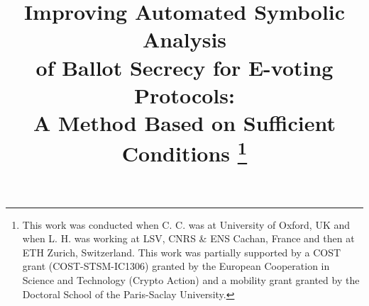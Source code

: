 \documentclass[a4paper,conference]{IEEEtran}
\begin{document}
\title{Improving Automated Symbolic Analysis \\
of Ballot Secrecy for E-voting Protocols:\\
A Method Based on Sufficient Conditions%
\thanks{This work was conducted when
C. C. was at University of Oxford, UK and
when L. H. was working at
LSV, CNRS \& ENS Cachan, France and then at ETH Zurich, Switzerland.
This work was partially supported by
a COST grant (COST\--STSM\--IC1306)
granted by the European Cooperation in Science and Technology (Crypto Action) and
a mobility grant granted by the Doctoral School of the Paris-Saclay University.
}
     }
\author{
 \and
{}
}
\end{document}
